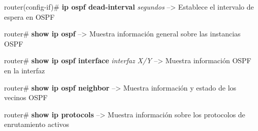 \documentclass[a4paper,11pt]{article}
\begin{document}
router(config-if)\# \textbf{ip ospf dead-interval} \textit{segundos} --> Establece el intervalo de espera en OSPF

router\# \textbf{show ip ospf} --> Muestra información general sobre las instancias OSPF

router\# \textbf{show ip ospf interface} \textit{interfaz X/Y} --> Muestra información OSPF en la interfaz

router\# \textbf{show ip ospf neighbor} --> Muestra información y estado de los vecinos OSPF

router\# \textbf{show ip protocols} --> Muestra información sobre los protocolos de enrutamiento activos


%
\end{document}
